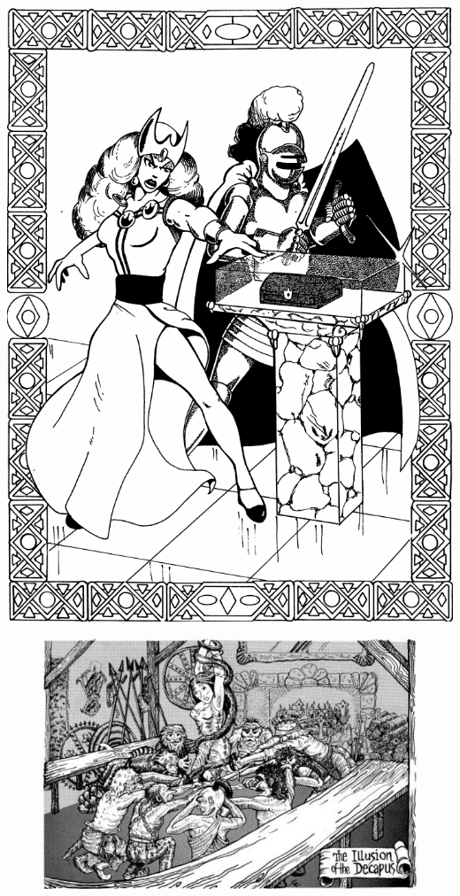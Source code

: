 \documentclass[palace_of_the_silver_princess]{subfiles}
\begin{document}
\includegraphics[width=\columnwidth]{img/ruby_box_2.png}

\begin{figure}[!ht]
    \includegraphics[width=\textwidth]{img/illusion.png}
\end{figure}
\end{document}
